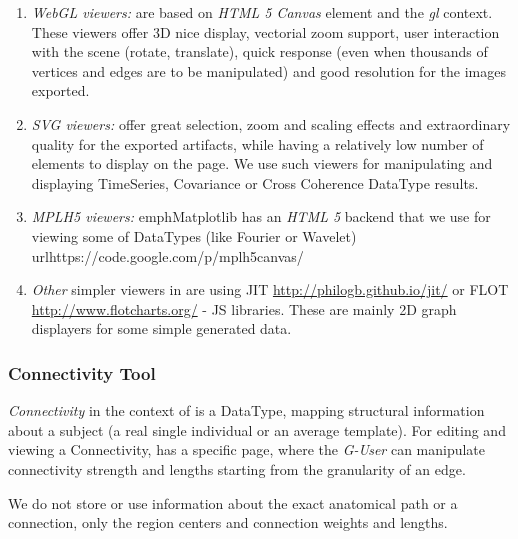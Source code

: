 \begin{enumerate}

    \item \emph{WebGL viewers:} are based on \emph{HTML 5 Canvas} element
    and the \emph{gl} context. These viewers offer 3D nice display,
    vectorial zoom support, user interaction with the scene (rotate,
    translate), quick response (even when thousands of vertices and edges
    are to be manipulated) and good resolution for the images exported.
    
    \item \emph{SVG viewers:} offer great selection, zoom and scaling
    effects and extraordinary quality for the exported artifacts, while
    having a relatively low number of elements to display on the page. We
    use such viewers for manipulating and displaying TimeSeries,
    Covariance or Cross Coherence DataType results.

    \item \emph{MPLH5 viewers:}  emph{Matplotlib} has an \emph{HTML 5}
    backend that we use for viewing some of \TVB DataTypes (like
    Fourier or Wavelet) url{https://code.google.com/p/mplh5canvas/}

    \item \emph{Other} simpler viewers in \TVB are using JIT
    \url{http://philogb.github.io/jit/} or FLOT
    \url{http://www.flotcharts.org/} - JS libraries. These are mainly
    2D graph displayers for some simple \TVB generated data.

\end{enumerate}


\subsubsection{Connectivity Tool}

    \emph{Connectivity} in the context of \TVB is a DataType, mapping structural
    information about a subject (a real single individual or an average template). For
    editing and viewing a Connectivity, \TVB has a specific page, where
    the \emph{G-User} can manipulate connectivity strength and lengths
    starting from the granularity of an edge.

    We do not store or use information about the exact anatomical path or
    a connection, only the region centers and connection weights and
    lengths.

